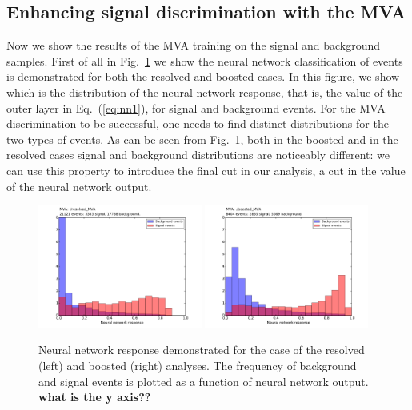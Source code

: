 \subsection{Enhancing signal discrimination with the MVA}

Now we show the results of the MVA training on the signal and
background samples.
%
First of all in Fig.~\ref{fig:nnresponse} we show
the neural network classification of events is demonstrated for both the resolved and boosted cases.
%
In this figure, we show which is the distribution of the neural network
response, that is, the value of the outer layer in Eq.~(\ref{eq:nn1}),
for signal and background events.
%
For the MVA discrimination to be successful, one needs to find
distinct distributions for the two types of events.
%
As can be seen from  Fig.~\ref{fig:nnresponse}, both
in the boosted and in the resolved cases signal and background
distributions are noticeably different: we can use this property
to introduce the final cut in our analysis, a cut in the value
of the neural network output.

\begin{figure}[t]
\begin{center}
\includegraphics[width=0.48\textwidth]{plots/resolved_MVA_hist.pdf}
\includegraphics[width=0.48\textwidth]{plots/boosted_MVA_hist.pdf}
\caption{\small Neural network response demonstrated for the case of the resolved (left) and boosted (right) analyses. The frequency of background and signal events is plotted as a function of neural network output.
{\bf what is the y axis??}
}
\label{fig:nnresponse}
\end{center}
\end{figure}


